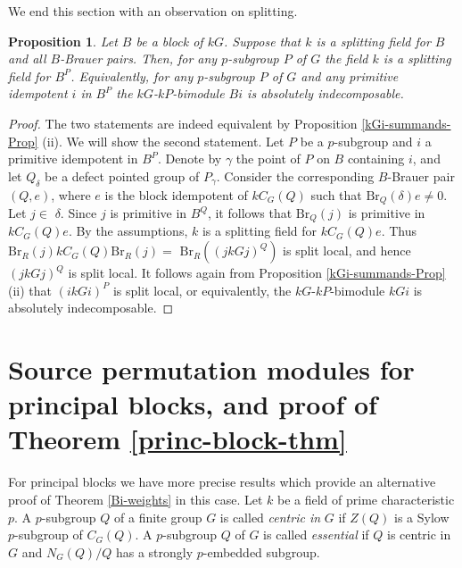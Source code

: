\documentclass{amsart}
\theoremstyle{plain}\newtheorem{Theorem}{Theorem}[section]
\theoremstyle{plain}\newtheorem{Conjecture}[Theorem]{Conjecture}
\theoremstyle{plain}\newtheorem{Corollary}[Theorem]{Corollary}
\theoremstyle{plain}\newtheorem{Lemma}[Theorem]{Lemma}
\theoremstyle{plain}\newtheorem{Proposition}[Theorem]{Proposition}
\theoremstyle{definition}\newtheorem{Definition}[Theorem]{Definition}
\theoremstyle{definition}\newtheorem{Example}[Theorem]{Example}
\theoremstyle{definition}\newtheorem{Examples}[Theorem]{Examples}
\theoremstyle{definition}\newtheorem{Exercise}[Theorem]{Exercise}
\theoremstyle{definition}\newtheorem{Notation}[Theorem]{Notation}
\theoremstyle{definition}\newtheorem{Remark}[Theorem]{Remark}
\theoremstyle{definition}\newtheorem{Remarks}[Theorem]{Remarks}
\theoremstyle{plain}\newtheorem{Statement}[Theorem]{}
\def\Br{\mathrm{Br}}                 \def\ten{\otimes}
\begin{document}
We end  this section with an observation  on splitting.

\begin{Proposition} \label{splitting-Lemma}
Let  $B$  be  a block of $kG$. Suppose that $k$ is a 
splitting  field for $B$ and all $B$-Brauer pairs.
Then, for any $p$-subgroup $P$ of $G$ the field $k$ is a splitting 
field for $B^P$.   Equivalently, for any $p$-subgroup $P$ of $G$ and 
any primitive idempotent $i$ in $B^P$ the $kG$-$kP$-bimodule $Bi$ is 
absolutely indecomposable.
\end{Proposition}

\begin{proof}
The two statements are indeed equivalent by Proposition 
\ref{kGi-summands-Prop} (ii). We will show the second statement. Let $P$ be a 
$p$-subgroup and $i$ a  primitive idempotent in $B^P$. Denote by $\gamma$ 
the point of $P$ on  $B$  containing $i$, and let  $Q_\delta$ be a defect 
pointed  group of  $P_\gamma$. Consider the corresponding $B$-Brauer pair 
$(Q,e)$, where  $e$ is the block idempotent of $kC_G(Q)$ such that $
\Br_Q(\delta)e\neq 0$. Let $j\in$ $\delta$. Since $j$ is primitive in $B^Q$, it 
follows that $\Br_Q(j)$ is primitive in $kC_G(Q)e$. By the assumptions, $k$ is 
a splitting field for $kC_G(Q)e$. Thus $\Br_R(j)kC_G(Q)\Br_R(j)=$ 
$\Br_R((jkGj)^Q)$ is split local, and hence $(jkGj)^Q$ is split local. It follows 
again from Proposition \ref{kGi-summands-Prop} (ii) that $(ikGi)^P$ is split 
local, or equivalently, the $kG$-$kP$-bimodule $kGi$ is absolutely 
indecomposable.
\end{proof}



\section{Source permutation modules for principal blocks, and proof of
Theorem \ref{princ-block-thm} }
\label{princ-block-Section}

For principal blocks we have more precise results which provide an alternative
proof of Theorem \ref{Bi-weights}  in this case.  Let $k$ be a field
of prime characteristic $p$. A  $p$-subgroup $Q$ of   a finite group $G$ is called 
{\em centric in} $G$ if $Z(Q)$ is a Sylow $p$-subgroup of $C_G(Q)$.  
A $p$-subgroup $Q$ of $G$ is called {\em essential} if $Q$ is centric in $G$ 
and  $N_G(Q)/Q$ has a strongly $p$-embedded  subgroup. 
\end{document}
